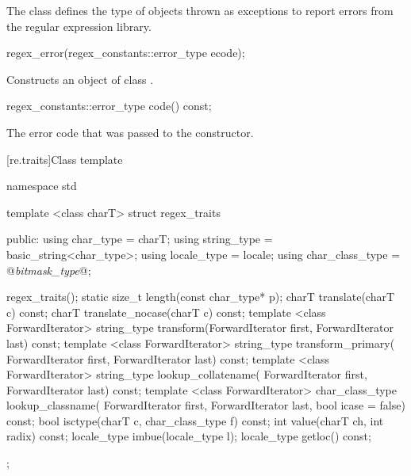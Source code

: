 \pnum
The class  defines the type of objects thrown as
exceptions to report errors from the regular expression library.

%
\begin{itemdecl}
regex_error(regex_constants::error_type ecode);
\end{itemdecl}

\begin{itemdescr}
\pnum\effects  Constructs an object of class .

\pnum\postconditions  {}
\end{itemdescr}

%
%
\begin{itemdecl}
regex_constants::error_type code() const;
\end{itemdecl}

\begin{itemdescr}
\pnum\returns The error code that was passed to the constructor.
\end{itemdescr}

[re.traits]{Class template }
%
\begin{codeblock}
namespace std {
  template <class charT>
  struct regex_traits {
  public:
     using char_type       = charT;
     using string_type     = basic_string<char_type>;
     using locale_type     = locale;
     using char_class_type = @{\itshape bitmask_type}@;

     regex_traits();
     static size_t length(const char_type* p);
     charT translate(charT c) const;
     charT translate_nocase(charT c) const;
     template <class ForwardIterator>
       string_type transform(ForwardIterator first, ForwardIterator last) const;
     template <class ForwardIterator>
       string_type transform_primary(
         ForwardIterator first, ForwardIterator last) const;
     template <class ForwardIterator>
       string_type lookup_collatename(
         ForwardIterator first, ForwardIterator last) const;
     template <class ForwardIterator>
       char_class_type lookup_classname(
         ForwardIterator first, ForwardIterator last, bool icase = false) const;
     bool isctype(charT c, char_class_type f) const;
     int value(charT ch, int radix) const;
     locale_type imbue(locale_type l);
     locale_type getloc() const;
  };
}
\end{codeblock}

